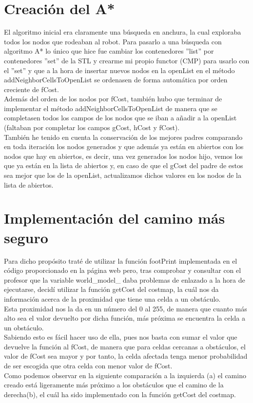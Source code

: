 \section{Creación del A*}

El algoritmo inicial era claramente una búsqueda en anchura, la cual exploraba todos los nodos que rodeaban al robot. Para pasarlo a una búsqueda con algoritmo A* lo único que hice fue cambiar los contenedores ''list'' por contenedores ''set'' de la STL y crearme mi propio functor (CMP) para usarlo con el ''set'' y que a la hora de insertar nuevos nodos en la openList en el método addNeighborCellsToOpenList se ordenasen de forma automática por orden creciente de fCost. \\ Además del orden de los nodos por fCost, también hubo que terminar de implementar el método addNeighborCellsToOpenList de manera que se completasen todos los campos de los nodos que se iban a añadir a la openList (faltaban por completar los campos gCost, hCost y fCost). \\
También he tenido en cuenta la conservación de los mejores padres comparando en toda iteración los nodos generados y que además ya están en abiertos con los nodos que hay en abiertos, es decir, una vez generados los nodos hijo, vemos los que ya están en la lista de abiertos y, en caso de que el gCost del padre de estos sea mejor que los de la openList, actualizamos dichos valores en los nodos de la lista de abiertos. \\

\section{Implementación del camino más seguro}

Para dicho propósito traté de utilizar la función footPrint implementada en el código proporcionado en la página web pero, tras comprobar y consultar con el profesor que la variable world\_model\_ daba problemas de enlazado a la hora de ejecutarse, decidí utilizar la función getCost del costmap, la cuál nos da información acerca de la proximidad que tiene una celda a un obstáculo. \\
Esta proximidad nos la da en un número del 0 al 255, de manera que cuanto más alto sea el valor devuelto por dicha función, más próxima se encuentra la celda a un obstáculo. \\
Sabiendo esto es fácil hacer uso de ella, pues nos basta con sumar el valor que devuelve la función al fCost, de manera que para celdas cercanas a obstáculos, el valor de fCost sea mayor y por tanto, la celda afectada tenga menor probabilidad de ser escogida que otra celda con menor valor de fCost. \\
Como podemos observar en la siguiente comparación a la izquierda (a) el camino creado está ligeramente más próximo a los obstáculos que el camino de la derecha(b), el cuál ha sido implementado con la función getCost del costmap.

